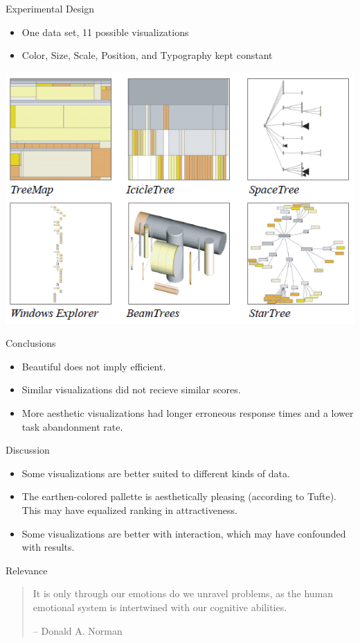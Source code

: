 \documentclass[12pt]{beamer}
\begin{document}
  \begin{frame}{Experimental Design}
    \begin{itemize}
      \item One data set, 11 possible visualizations
            
      \item Color, Size, Scale, Position, and Typography kept constant
    \end{itemize}
    
    \begin{center}
      \includegraphics[scale=0.5]{visualizations.png}
    \end{center}
  \end{frame}

  \begin{frame}{Conclusions}
    \begin{itemize}
      \item Beautiful does not imply efficient.
      \item Similar visualizations did not recieve similar scores.
      \item More aesthetic visualizations had longer erroneous response times
            and a lower task abandonment rate.
    \end{itemize}
  \end{frame}
  
  \begin{frame}{Discussion}
    \begin{itemize}
      \item Some visualizations are better suited to different kinds of data.
      \item The earthen-colored pallette is aesthetically pleasing (according
            to Tufte). This may have equalized ranking in attractiveness.
      \item Some visualizations are better with interaction, which may have
            confounded with results.
    \end{itemize}
  \end{frame}
  
  \begin{frame}{Relevance}
    \begin{quote}
      It is only through our emotions do we unravel problems, as the human
      emotional system is intertwined with our cognitive abilities.
      
      -- Donald A. Norman
    \end{quote}
  \end{frame}
\end{document}

